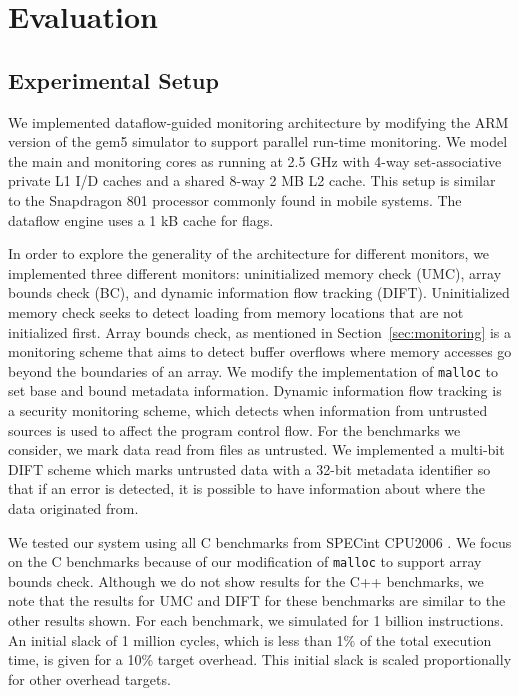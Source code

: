 \section{Evaluation}
\label{sec:evaluation}

\subsection{Experimental Setup}
\label{sec:evaluation.setup}

We implemented dataflow-guided monitoring architecture by
modifying the ARM version of the gem5 simulator \cite{gem5} to support parallel
run-time monitoring. We model the main and monitoring cores as running at 2.5
GHz with 4-way set-associative private L1 I/D caches and a shared 8-way 2 MB L2
cache. This setup is similar to the Snapdragon 801 processor commonly found in
mobile systems. The dataflow engine uses a 1 kB cache for flags.

In order to explore the generality of the architecture for
different monitors, we implemented three different monitors: uninitialized
memory check (UMC), array bounds check (BC), and dynamic information flow
tracking (DIFT).  Uninitialized memory check seeks to detect loading from
memory locations that are not initialized first.  Array bounds check, as
mentioned in Section~\ref{sec:monitoring} is a monitoring scheme that aims to
detect buffer overflows where memory accesses go beyond the boundaries of an
array. We modify the implementation of {\tt malloc} to set base and bound
metadata information. Dynamic information flow tracking is a security
monitoring scheme,
which detects when information from untrusted sources is used to affect the
program control flow. For the benchmarks we consider, we mark data read from
files as untrusted. We implemented a multi-bit DIFT scheme which marks
untrusted data with a 32-bit metadata identifier so
that if an error is detected, it is possible to have information about where
the data originated from. 

We tested our system using all C benchmarks from SPECint
CPU2006 \cite{spec2006}. We focus on the C benchmarks because of our
modification of {\tt malloc} to support array bounds check. Although we do not
show results for the C++ benchmarks, we note that the results for UMC and DIFT
for these benchmarks are similar to the other results shown. For each
benchmark, we simulated for 1 billion instructions. An initial slack of 1
million cycles, which is less than 1\% of
the total execution time, is given for a 10\% target overhead. This initial
slack is scaled proportionally for other overhead targets.

